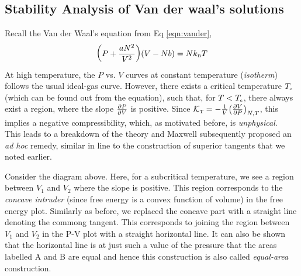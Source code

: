 \subsection{Stability Analysis of Van der waal's solutions}
Recall the Van der Waal's equation from Eq \eqref{eqn:vander},
$$\qty(P+\frac{aN^2}{V^2})\qty(V-Nb) = Nk_{\text{\tiny B}} T$$
At high temperature, the $P$ vs. $V$ curves at constant temperature (\textit{isotherm}) follows the usual ideal-gas curve. However, there exists a critical temperature $T_{\text{\tiny c}}$ (which can be found out from the equation), such that, for $T<T_{\text{\tiny c}}$, there always exist a region, where the slope $\pdv{P}{V}$ is positive. Since $\mathcal K_{\text{\tiny T}} = -\frac{1}{V}\qty(\pdv{V}{P})_{N,T}$, this implies a negative compressibility, which, as motivated before, is \textit{unphysical}.\\[0.2cm]
This leads to a breakdown of the theory and Maxwell subsequently proposed an \textit{ad hoc} remedy, similar in line to the construction of superior tangents that we noted earlier. 
\begin{figure}[H]
    \centering 
    
\end{figure}
\noindent
Consider the diagram above. Here, for a subcritical temperature, we see a region between $V_1$ and $V_2$ where the slope is positive. This region corresponds to the \textit{concave intruder} (since free energy is a convex function of volume) in the free energy plot. Similarly as before, we replaced the concave part with a straight line denoting the commong tangent. This corresponds to joining the region between $V_1$ and $V_2$ in the P-V plot with a straight horizontal line. It can also be shown that the horizontal line is at just such a value of the pressure that the areas labelled A and B are equal and hence this construction is also called \textit{equal-area} construction. 
